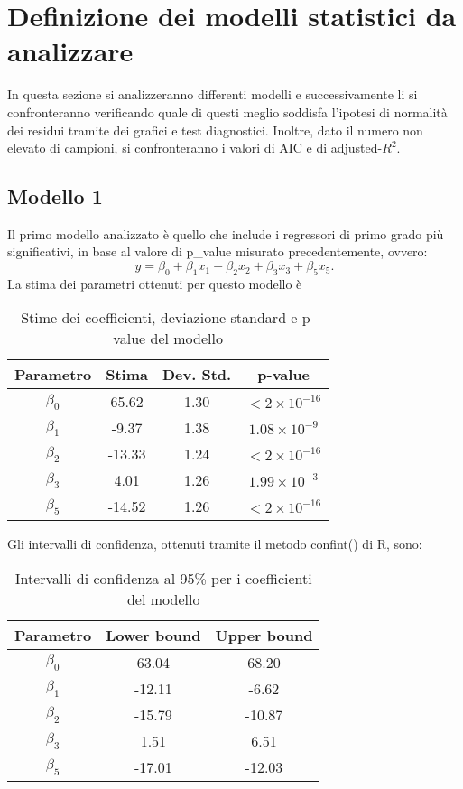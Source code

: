 \section{Definizione dei modelli statistici da analizzare}
In questa sezione si analizzeranno differenti modelli e successivamente li si confronteranno verificando quale di questi meglio soddisfa l'ipotesi di normalità dei residui tramite dei grafici e test diagnostici. Inoltre, dato il numero non elevato di campioni, si confronteranno i valori di AIC e di adjusted-$R^2$.


\subsection{Modello 1}
Il primo modello analizzato è quello che include i regressori di primo grado più significativi, in base al valore di p\_value misurato precedentemente, ovvero:
\begin{equation*}
y=\beta_0+\beta_1x_1+\beta_2x_2+\beta_3x_3+\beta_5x_5.
\end{equation*}
La stima dei parametri ottenuti per questo modello è
\begin{table}[H]
	\centering
	\begin{tabular}{|c|c|c|c|}
		\hline
		\textbf{Parametro} & \textbf{Stima} & \textbf{Dev. Std.} & \textbf{p-value} \\
		\hline
		$\beta_0$ & 65.62  & 1.30  & \( < 2 \times 10^{-16} \) \\
		$\beta_1$ & -9.37  & 1.38  & \( 1.08 \times 10^{-9} \) \\
		$\beta_2$ & -13.33 & 1.24  & \( < 2 \times 10^{-16} \) \\
		$\beta_3$   & 4.01   & 1.26  & \( 1.99 \times 10^{-3} \) \\
		$\beta_5$  & -14.52 & 1.26  & \( < 2 \times 10^{-16} \) \\
		\hline
	\end{tabular}
	\caption{Stime dei coefficienti, deviazione standard e p-value del modello}
	\label{tab:coef_estimates}
\end{table}



Gli intervalli di confidenza, ottenuti tramite il metodo confint() di R, sono:
\begin{table}[H]
	\centering
	\begin{tabular}{|c|c|c|}
		\hline
		\textbf{Parametro} & \textbf{Lower bound} & \textbf{Upper bound} \\
		\hline
		$\beta_0$ & 63.04 & 68.20 \\
		$\beta_1$ & -12.11 & -6.62 \\
		$\beta_2$ & -15.79 & -10.87 \\
		$\beta_3$ & 1.51 & 6.51 \\
		$\beta_5$ & -17.01 & -12.03 \\
		\hline
	\end{tabular}
	\caption{Intervalli di confidenza al 95\% per i coefficienti del modello}
	\label{tab:ci_coefficienti}
\end{table}

